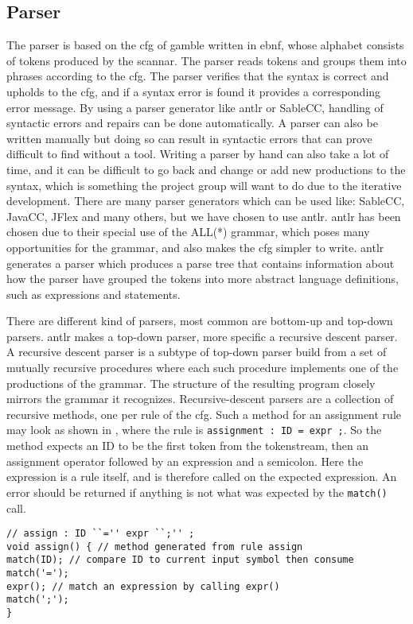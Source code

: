\subsection*{Parser}\label{subsec:parser}
The parser is based on the \acrfull{cfg} of \gls{gamble} written in \acrfull{ebnf}, whose alphabet consists of tokens produced by the scannar.
The parser reads tokens and groups them into phrases according to the \acrshort{cfg}.
The parser verifies that the syntax is correct and upholds to the \acrshort{cfg}, and if a syntax error is found it provides a corresponding error message. \citep{Crafting_book}
By using a parser generator like \acrshort{antlr} or SableCC, handling of syntactic errors and repairs can be done automatically.
A parser can also be written manually but doing so can result in syntactic errors that can prove difficult to find without a tool.
Writing a parser by hand can also take a lot of time, and it can be difficult to go back and change or add new productions to the syntax, which is something the project group will want to do due to the iterative development.
There are many parser generators which can be used like: SableCC, JavaCC, JFlex and many others, but we have chosen to use \acrshort{antlr}.
\acrshort{antlr} has been chosen due to their special use of the ALL(*) grammar, which poses many opportunities for the grammar, and also makes the \acrshort{cfg} simpler to write.
\acrshort{antlr} generates a parser which produces a parse tree that contains information about how the parser have grouped the tokens into more abstract language definitions, such as expressions and statements.

There are different kind of parsers, most common are bottom-up and top-down parsers.
\acrshort{antlr} makes a top-down parser, more specific a recursive descent parser.
A recursive descent parser is a subtype of top-down parser build from a set of mutually recursive procedures where each such procedure implements one of the productions of the grammar.
The structure of the resulting program closely mirrors the grammar it recognizes. \citep{Recursive_programming}
Recursive-descent parsers are a collection of recursive methods, one per rule of the \acrshort{cfg}.
Such a method for an assignment rule may look as shown in , where the rule is \texttt{assignment : ID = expr ;}.
So the method expects an ID to be the first token from the tokenstream, then an assignment operator followed by an expression and a semicolon.
Here the expression is a rule itself, and is therefore called on the expected expression.
An error should be returned if anything is not what was expected by the \texttt{match()} call.
\begin{lstlisting}[caption=Example a recursive descent parser method,frame=tlrb,label={lst:rdpmethod}]
// assign : ID ``='' expr ``;'' ;
void assign() { // method generated from rule assign
match(ID); // compare ID to current input symbol then consume
match('=');
expr(); // match an expression by calling expr()
match(';');
}
\end{lstlisting}

